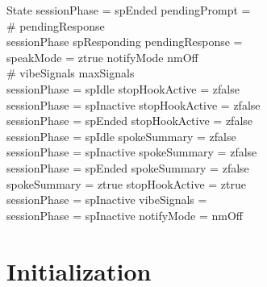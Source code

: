 \documentclass[a4paper,10pt,fleqn]{article}
\begin{document}
\begin{schema}{State}
  sessionPhase = spEnded \implies pendingPrompt = \emptyset \\
  \# pendingResponse  \\
  sessionPhase \neq spResponding \implies pendingResponse = \emptyset \\
  speakMode = ztrue \implies notifyMode \neq nmOff \\
  \# vibeSignals \leq maxSignals \\
  sessionPhase = spIdle \implies stopHookActive = zfalse \\
  sessionPhase = spInactive \implies stopHookActive = zfalse \\
  sessionPhase = spEnded \implies stopHookActive = zfalse \\
  sessionPhase = spIdle \implies spokeSummary = zfalse \\
  sessionPhase = spInactive \implies spokeSummary = zfalse \\
  sessionPhase = spEnded \implies spokeSummary = zfalse \\
  spokeSummary = ztrue \implies stopHookActive = ztrue \\
  sessionPhase = spInactive \implies vibeSignals = \emptyset \\
  sessionPhase = spInactive \implies notifyMode = nmOff
\end{schema}

\section{Initialization}
\end{document}
